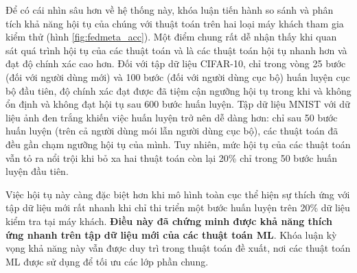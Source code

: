\begin{table}[H]
    \centering
    \caption{Bảng độ chính xác (\%) của thuật toán FedAvg và các thuật toán FedMeta tính trên điểm dữ liệu (dữ liệu Non-IID)}
    \label{tab:acc_fedmeta}
\end{table}

Để có cái nhìn sâu hơn về hệ thống này, khóa luận tiến hành so sánh và phân tích khả năng hội tụ của chúng với thuật toán  trên hai loại máy khách tham gia kiểm thử (hình \ref{fig:fedmeta_acc}). Một điểm chung rất dễ nhận thấy khi quan sát quá trình hội tụ của các thuật toán  và  là các thuật toán  hội tụ nhanh hơn và đạt độ chính xác cao hơn. Đối với tập dữ liệu CIFAR-10, chỉ trong vòng 25 bước (đối với người dùng mới) và 100 bước (đối với người dùng cục bộ) huấn luyện cục bộ đầu tiên, độ chính xác đạt được đã tiệm cận ngưỡng hội tụ trong khi  và  không ổn định và không đạt hội tụ sau 600 bước huấn luyện. Tập dữ liệu MNIST với dữ liệu ảnh đen trắng khiến việc huấn luyện trở nên dễ dàng hơn: chỉ sau 50 bước huấn luyện (trên cả người dùng mói lẫn người dùng cục bộ), các thuật toán đã đều gần chạm ngưỡng hội tụ của mình. Tuy nhiên, mức hội tụ của các thuật toán  vẫn tỏ ra nổi trội khi bỏ xa hai thuật toán còn lại 20\% chỉ trong 50 bước huấn luyện đầu tiên.

Việc hội tụ này càng đặc biệt hơn khi mô hình toàn cục thể hiện sự thích ứng với tập dữ liệu mới rất nhanh khi chỉ thi triển một bước huấn luyện trên 20\% dữ liệu kiểm tra tại máy khách. \textbf{Điều này đã chứng minh được khả năng thích ứng nhanh trên tập dữ liệu mới của các thuật toán ML}. Khóa luận kỳ vọng khả năng này vẫn được duy trì trong thuật toán đề xuất, nơi các thuật toán ML được sử dụng để tối ưu các lớp phần chung.

